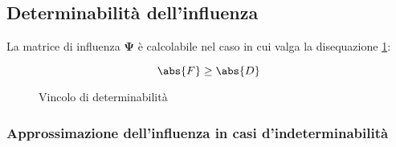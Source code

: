 \documentclass[\main/main.tex]{subfiles}
\begin{document}
\subsection{Determinabilità dell'influenza}
La matrice di influenza $\bm{\Psi}$ è calcolabile nel caso in cui valga la disequazione \ref{influenza_determinabile}:


\begin{figure}
	\[
		\abs{F} \geq \abs{D}
	\]
	\caption{Vincolo di determinabilità}
	\label{influenza_determinabile}
\end{figure}



\subsubsection{Approssimazione dell'influenza in casi d'indeterminabilità}
\end{document}
